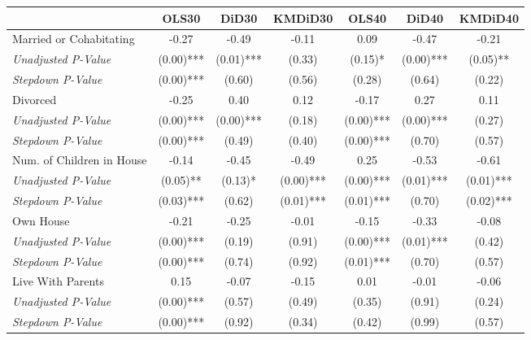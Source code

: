 \begin{tabular}{l c c c c c c}
\toprule
 & OLS30 & DiD30 & KMDiD30 & OLS40 & DiD40 & KMDiD40 \\
\midrule
Married or Cohabitating & -0.27 & -0.49 & -0.11 & 0.09 & -0.47 & -0.21 \\
\quad \textit{Unadjusted P-Value} & (0.00)*** & (0.01)*** & (0.33) & (0.15)* & (0.00)*** & (0.05)** \\
\quad \textit{Stepdown P-Value} & (0.00)*** & (0.60) & (0.56) & (0.28) & (0.64) & (0.22) \\
Divorced & -0.25 & 0.40 & 0.12 & -0.17 & 0.27 & 0.11 \\
\quad \textit{Unadjusted P-Value} & (0.00)*** & (0.00)*** & (0.18) & (0.00)*** & (0.00)*** & (0.27) \\
\quad \textit{Stepdown P-Value} & (0.00)*** & (0.49) & (0.40) & (0.00)*** & (0.70) & (0.57) \\
Num. of Children in House & -0.14 & -0.45 & -0.49 & 0.25 & -0.53 & -0.61 \\
\quad \textit{Unadjusted P-Value} & (0.05)** & (0.13)* & (0.00)*** & (0.00)*** & (0.01)*** & (0.01)*** \\
\quad \textit{Stepdown P-Value} & (0.03)*** & (0.62) & (0.01)*** & (0.01)*** & (0.70) & (0.02)*** \\
Own House & -0.21 & -0.25 & -0.01 & -0.15 & -0.33 & -0.08 \\
\quad \textit{Unadjusted P-Value} & (0.00)*** & (0.19) & (0.91) & (0.00)*** & (0.01)*** & (0.42) \\
\quad \textit{Stepdown P-Value} & (0.00)*** & (0.74) & (0.92) & (0.01)*** & (0.70) & (0.57) \\
Live With Parents & 0.15 & -0.07 & -0.15 & 0.01 & -0.01 & -0.06 \\
\quad \textit{Unadjusted P-Value} & (0.00)*** & (0.57) & (0.49) & (0.35) & (0.91) & (0.24) \\
\quad \textit{Stepdown P-Value} & (0.00)*** & (0.92) & (0.34) & (0.42) & (0.99) & (0.57) \\
\bottomrule
\end{tabular}
